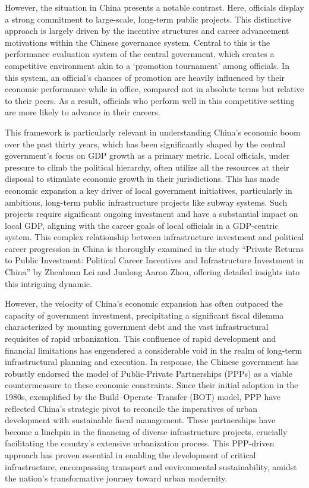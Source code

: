 \documentclass[12pt, ]{article}
\begin{document}
However, the situation in China presents a notable contrast. Here,
officials display a strong commitment to large-scale, long-term public
projects. This distinctive approach is largely driven by the incentive
structures and career advancement motivations within the Chinese
governance system. Central to this is the performance evaluation system
of the central government, which creates a competitive environment akin
to a `promotion tournament' among officials.\citep{WANG2021106888} In
this system, an official's chances of promotion are heavily influenced
by their economic performance while in office, compared not in absolute
terms but relative to their peers. As a result, officials who perform
well in this competitive setting are more likely to advance in their
careers.\citep{li2005political}

This framework is particularly relevant in understanding China's
economic boom over the past thirty years, which has been significantly
shaped by the central government's focus on GDP growth as a primary
metric. Local officials, under pressure to climb the political
hierarchy, often utilize all the resources at their disposal to
stimulate economic growth in their jurisdictions. This has made economic
expansion a key driver of local government initiatives, particularly in
ambitious, long-term public infrastructure projects like subway systems.
Such projects require significant ongoing investment and have a
substantial impact on local GDP, aligning with the career goals of local
officials in a GDP-centric system. This complex relationship between
infrastructure investment and political career progression in China is
thoroughly examined in the study ``Private Returns to Public Investment:
Political Career Incentives and Infrastructure Investment in China'' by
Zhenhuan Lei and Junlong Aaron Zhou, offering detailed insights into
this intriguing dynamic.

However, the velocity of China's economic expansion has often outpaced
the capacity of government investment, precipitating a significant
fiscal dilemma characterized by mounting government debt and the vast
infrastructural requisites of rapid urbanization. This confluence of
rapid development and financial limitations has engendered a
considerable void in the realm of long-term infrastructural planning and
execution. In response, the Chinese government has robustly endorsed the
model of Public-Private Partnerships (PPPs) as a viable countermeasure
to these economic constraints. Since their initial adoption in the
1980s, exemplified by the Build--Operate--Transfer (BOT) model, PPP have
reflected China's strategic pivot to reconcile the imperatives of urban
development with sustainable fiscal management.\citep{li2023public}
These partnerships have become a linchpin in the financing of diverse
infrastructure projects, crucially facilitating the country's extensive
urbanization process. This PPP-driven approach has proven essential in
enabling the development of critical infrastructure, encompassing
transport and environmental sustainability, amidst the nation's
transformative journey toward urban modernity.
\end{document}
